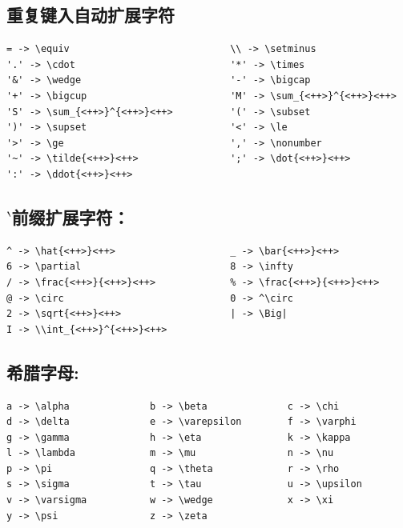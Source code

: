 \documentclass[a4paper,11pt]{article}
\begin{document}
\subsection{重复键入自动扩展字符}
\begin{Verbatim}
= -> \equiv                            \\ -> \setminus
'.' -> \cdot                           '*' -> \times
'&' -> \wedge                          '-' -> \bigcap
'+' -> \bigcup                         'M' -> \sum_{<++>}^{<++>}<++>
'S' -> \sum_{<++>}^{<++>}<++>          '(' -> \subset
')' -> \supset                         '<' -> \le
'>' -> \ge                             ',' -> \nonumber
'~' -> \tilde{<++>}<++>                ';' -> \dot{<++>}<++>
':' -> \ddot{<++>}<++>
\end{Verbatim}

\subsection{$\backprime$前缀扩展字符：}
\begin{Verbatim}
^ -> \hat{<++>}<++>                    _ -> \bar{<++>}<++>
6 -> \partial                          8 -> \infty
/ -> \frac{<++>}{<++>}<++>             % -> \frac{<++>}{<++>}<++>
@ -> \circ                             0 -> ^\circ
2 -> \sqrt{<++>}<++>                   | -> \Big|
I -> \\int_{<++>}^{<++>}<++>
\end{Verbatim}

\subsection{希腊字母:}
\begin{Verbatim}
a -> \alpha              b -> \beta              c -> \chi
d -> \delta              e -> \varepsilon        f -> \varphi
g -> \gamma              h -> \eta               k -> \kappa
l -> \lambda             m -> \mu                n -> \nu
p -> \pi                 q -> \theta             r -> \rho
s -> \sigma              t -> \tau               u -> \upsilon
v -> \varsigma           w -> \wedge             x -> \xi
y -> \psi                z -> \zeta
\end{Verbatim}
{\huge\textcolor{red}{\makebox[\textwidth][s]{
$\alpha{}\ \beta{}\ \chi{}\ \delta{}\ \varepsilon{}\ %
\varphi{}\ \gamma{}\ \eta{}\ \kappa{}\ \lambda{}\ \mu{}\ \nu{}\ %
\pi{}\ \theta{}\ \rho{}\ \sigma{}\ \tau{}\ \upsilon{}\ %
\varsigma{}\ \wedge{}\ \xi{}\ \psi{}\ \zeta$}}}
\end{document}

